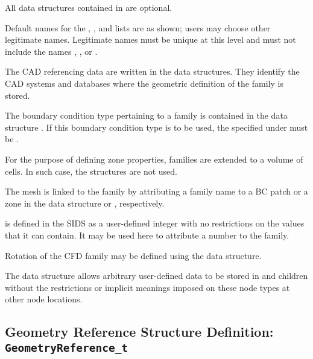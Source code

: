 \begin{notes}
\item All data structures contained in  are optional.
\item Default names for the ,
      , and  lists
      are as shown; users may choose other legitimate names.
      Legitimate names must be unique at this level and must
      not include the names , , or
      .
\item The CAD referencing data are written in the
       data structures.
      They identify the CAD systems and databases where the geometric
      definition of the family is stored.
\item The boundary condition type pertaining to a family is contained in
      the data structure .
      If this boundary condition type is to be used, the 
      specified under  must be .
\item For the purpose of defining zone properties, families are extended
      to a volume of cells.
      In such case, the  structures are not
      used.
\item The mesh is linked to the family by attributing a family name
      to a BC patch or a zone in the data structure  or
      , respectively.
\item {} is defined in the SIDS as a user-defined integer
      with no restrictions on the values that it can contain.
      It may be used here to attribute a number to the family.
\end{notes}

Rotation of the CFD family may be defined using the
 data structure.

The  data structure allows arbitrary
user-defined data to be stored in  and
 children without the restrictions or implicit
meanings imposed on these node types at other node locations.

\subsection{Geometry Reference Structure Definition: \texttt{GeometryReference\_t}}
\label{s:GeometryReference}


